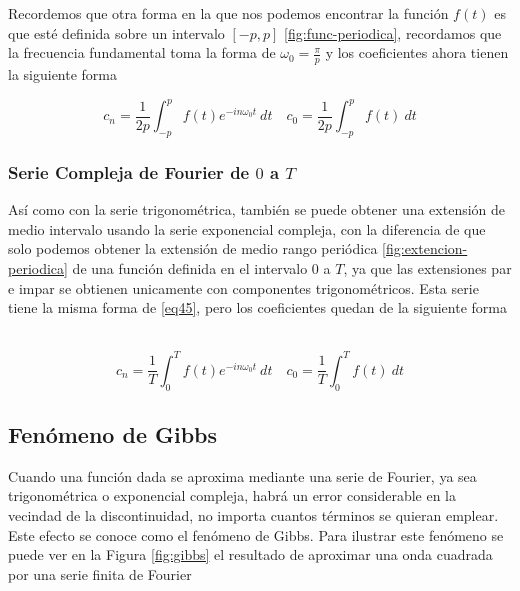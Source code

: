 Recordemos que otra forma en la que nos podemos encontrar la función $f(t)$ es que esté definida sobre un intervalo $[-p, p]$ \ref{fig:func-periodica}, recordamos que la frecuencia fundamental toma la forma de $\omega_0 = \frac{\pi}{p}$ y los coeficientes ahora tienen la siguiente forma

\begin{equation}\label{eq44}
	c_n = \frac{1}{2p} \int_{-p}^{p} f(t) e^{-i n \omega_0 t} \ dt \quad c_0 = \frac{1}{2p} \int_{-p}^{p} f(t)\ dt 
\end{equation}

\subsubsection{Serie Compleja de Fourier de $0$ a $T$}
Así como con la serie trigonométrica, también se puede obtener una extensión de medio intervalo usando la serie exponencial compleja, con la diferencia de que solo podemos obtener la extensión de medio rango periódica \ref{fig:extencion-periodica} de una función definida en el intervalo $0$ a $T$, ya que las extensiones par e impar se obtienen unicamente con componentes trigonométricos. Esta serie tiene la misma forma de \eqref{eq45}, pero los coeficientes quedan de la siguiente forma ~\cite{fourierCinvestav}

\begin{equation}\label{eq46}
	c_n = \frac{1}{T} \int_{0}^{T} f(t) e^{-i n \omega_0 t} \ dt \quad c_0 = \frac{1}{T} \int_{0}^{T} f(t)\ dt 
\end{equation}

\subsection{Fenómeno de Gibbs}
Cuando una función dada se aproxima mediante una serie de Fourier, ya sea trigonométrica o exponencial compleja, habrá un error considerable en la vecindad de la discontinuidad, no importa cuantos términos se quieran emplear. Este efecto se conoce como el fenómeno de Gibbs. Para ilustrar este fenómeno se puede ver en la Figura \ref{fig:gibbs} el resultado de aproximar una onda cuadrada por una serie finita de Fourier ~\cite{fourierCarrillo}

